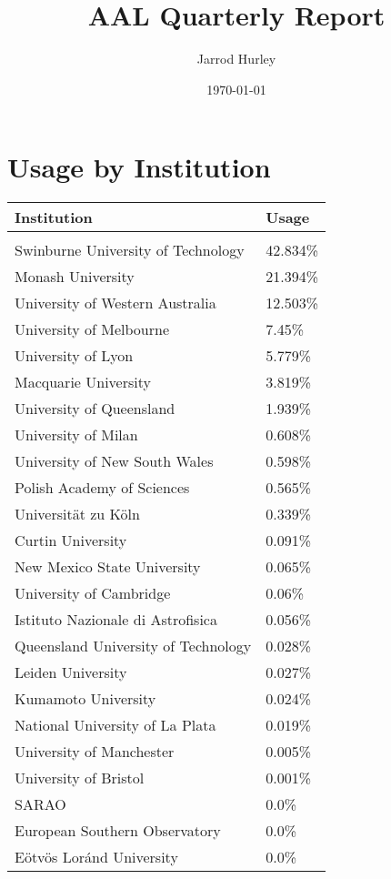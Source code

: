 \documentclass{article}%
\title{AAL Quarterly Report}%
\author{Jarrod Hurley}%
\date{\today}%
\begin{document}
%
\normalsize%
\maketitle%
\newpage%
\section{Usage by Institution }%

%
\begin{longtabu}{X[l] X[r]}%
\textbf{Institution}&\textbf{Usage}\\%
\hline%
&\\%
Swinburne University of Technology&42.834\%\\%
\hline%
Monash University&21.394\%\\%
\hline%
University of Western Australia&12.503\%\\%
\hline%
University of Melbourne&7.45\%\\%
\hline%
University of Lyon&5.779\%\\%
\hline%
Macquarie University&3.819\%\\%
\hline%
University of Queensland&1.939\%\\%
\hline%
University of Milan&0.608\%\\%
\hline%
University of New South Wales&0.598\%\\%
\hline%
Polish Academy of Sciences&0.565\%\\%
\hline%
Universität zu Köln&0.339\%\\%
\hline%
Curtin University&0.091\%\\%
\hline%
New Mexico State University&0.065\%\\%
\hline%
University of Cambridge&0.06\%\\%
\hline%
Istituto Nazionale di Astrofisica&0.056\%\\%
\hline%
Queensland University of Technology&0.028\%\\%
\hline%
Leiden University&0.027\%\\%
\hline%
Kumamoto University&0.024\%\\%
\hline%
National University of La Plata&0.019\%\\%
\hline%
University of Manchester&0.005\%\\%
\hline%
University of Bristol&0.001\%\\%
\hline%
SARAO&0.0\%\\%
\hline%
European Southern Observatory&0.0\%\\%
\hline%
Eötvös Loránd University&0.0\%\\%

\end{longtabu}
\end{document}

